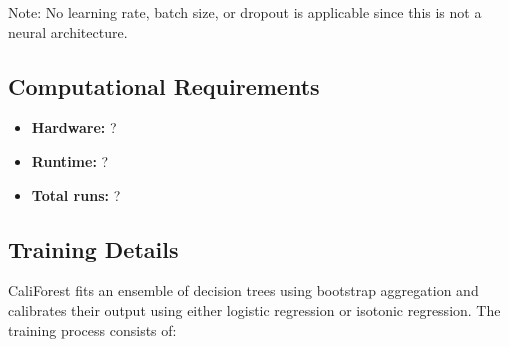 \documentclass{article}
\begin{document}
Note: No learning rate, batch size, or dropout is applicable since this is not a neural architecture.

\subsection*{Computational Requirements}

\begin{itemize}
  \item \textbf{Hardware:} ?
  \item \textbf{Runtime:} ?
  \item \textbf{Total runs:} ?
\end{itemize}

\subsection*{Training Details}

CaliForest fits an ensemble of decision trees using bootstrap aggregation and calibrates their output using either logistic regression or isotonic regression. The training process consists of:
\end{document}
